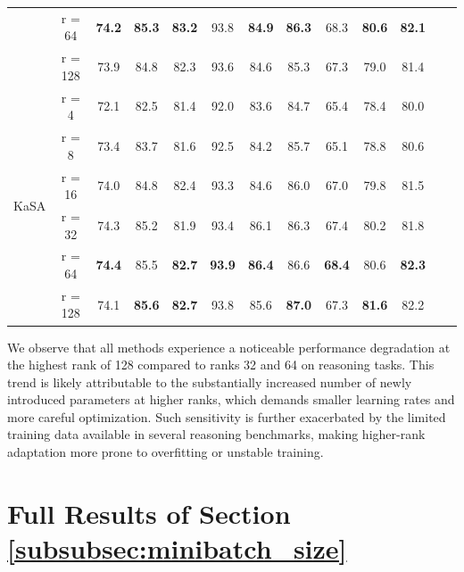 \documentclass{article}
\theoremstyle{plain}
\theoremstyle{definition}
\theoremstyle{remark}
\begin{document}
\begin{table}[h]
{\begin{tabular}{ccccccccccccc}
      & r = 64 & \textbf{74.2} & \textbf{85.3} & \textbf{83.2} & 93.8 & \textbf{84.9} & \textbf{86.3} & 68.3 & \textbf{80.6} & \textbf{82.1}\\
      & r = 128 & 73.9 & 84.8 & 82.3 & 93.6 & 84.6 & 85.3 & 67.3 & 79.0 & 81.4\\
      \hline
      \multirow{6}{*}{KaSA} 
      & r = 4 & 72.1 & 82.5 & 81.4 & 92.0 & 83.6 & 84.7 & 65.4 & 78.4 & 80.0\\
      & r = 8 & 73.4 & 83.7 & 81.6 & 92.5 & 84.2 & 85.7 & 65.1 & 78.8 & 80.6\\
      & r = 16 & 74.0 & 84.8 & 82.4 & 93.3 & 84.6 & 86.0 & 67.0 & 79.8 & 81.5\\
      & r = 32 & 74.3 & 85.2 & 81.9 & 93.4 & 86.1 & 86.3 & 67.4 & 80.2 & 81.8\\
      & r = 64 & \textbf{74.4} & 85.5 & \textbf{82.7} & \textbf{93.9} & \textbf{86.4} & 86.6 & \textbf{68.4} & 80.6 & \textbf{82.3}\\
      & r = 128 & 74.1 & \textbf{85.6} & \textbf{82.7} & 93.8 & 85.6 & \textbf{87.0} & 67.3 & \textbf{81.6} & 82.2\\
      \hline
    \end{tabular}
  }
  
\end{table}

We observe that all methods experience a noticeable performance degradation at the highest rank of 128 compared to ranks 32 and 64 on reasoning tasks. This trend is likely attributable to the substantially increased number of newly introduced parameters at higher ranks, which demands smaller learning rates and more careful optimization. Such sensitivity is further exacerbated by the limited training data available in several reasoning benchmarks, making higher-rank adaptation more prone to overfitting or unstable training.




\section{Full Results of Section \ref{subsubsec:minibatch_size}}
\label{appendix:full_minibatch_results}
\end{document}
